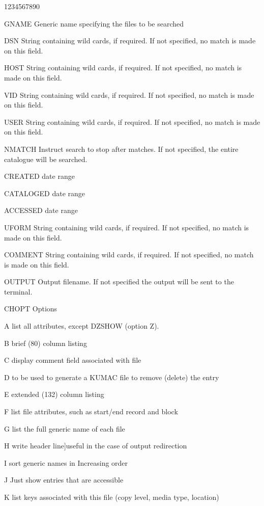 \begin{DLtt}{1234567890}
\item[GNAME]Generic name specifying the files to be searched
\item[DSN]String containing wild cards, if required. If not specified,
no match is made on this field.
\item[HOST]String containing wild cards, if required. If not specified,
no match is made on this field.
\item[VID]String containing wild cards, if required. If not specified,
no match is made on this field.
\item[USER]String containing wild cards, if required. If not specified,
no match is made on this field.
\item[NMATCH]Instruct search to stop after  matches. If
not specified, the entire catalogue will be searched.
\item[CREATED]date range
\item[CATALOGED]date range
\item[ACCESSED]date range
\item[UFORM]String containing wild cards, if required. If not specified,
no match is made on this field.
\item[COMMENT]String containing wild cards, if required. If not specified,
no match is made on this field.
\item[OUTPUT]Output filename. If not specified the output will 
be sent to the terminal.
\item[CHOPT]Options
\begin{DLtt}{12}
\item[A]list all attributes, except DZSHOW (option Z).
\item[B]brief (80) column listing
\item[C]display comment field associated with file
\item[D]to be used to generate a KUMAC file to remove (delete) the entry
\item[E]extended (132) column listing
\item[F]list file attributes, such as start/end record and block
\item[G]list the full generic name of each file
\item[H]write header line]useful in the case of output redirection 
\item[I]sort generic names in Increasing order
\item[J]Just show entries that are accessible
\item[K]list keys associated with this file (copy level, media type, location)

\end{DLtt}
\end{DLtt}
